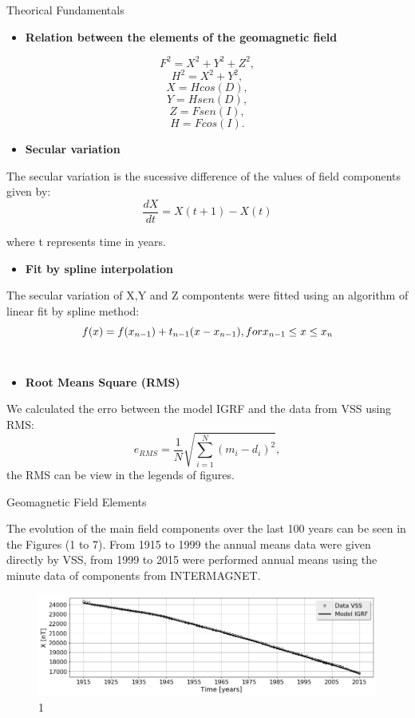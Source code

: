 \documentclass[final,t]{beamer}
\begin{document}
\begin{columns}[t]
\begin{column}{.66\linewidth}
\begin{columns}
\begin{column}{.31\linewidth}
\begin{block}{Theorical Fundamentals}


\begin{itemize}
\item \bf{Relation between the elements of the geomagnetic field}
\end{itemize}	
\[ F^{2} = X^{2} + Y^{2} + Z^{2},\]
 \[  H^{2} = X^{2} + Y^{2}, \]
\[	   X = Hcos(D),\]
\[	   Y = Hsen(D),\]
\[	   Z = Fsen(I),\]
\[	   H = Fcos(I).\]
   	

\begin{itemize}	
	\item \bf{Secular variation}
\end{itemize}
The secular variation is the sucessive difference of the values of field components given by:
\[\frac{dX}{dt} = X(t+1)-X(t)\]

where t represents time in years.

\begin{itemize}
		\item \bf{Fit by spline interpolation}
\end{itemize}
The secular variation of X,Y and Z compontents were fitted using an algorithm  of linear fit by spline method: 
	\[ f(x)= f(x_{n-1})+t_{n-1}(x-x_{n-1}), \\
	for x_{n-1} \le x \le x_{n} \]\\

\begin{itemize}
\item \bf{Root Means Square (RMS)}
\end{itemize}
We calculated the erro between the model IGRF and the data from VSS using RMS:
\[e_{RMS}=\frac{1}{N} \sqrt{\sum\limits_{i=1}^{N}(m_{i}-d_{i})^{2}}, 
\]
the RMS can be view in the legends of figures.
 
	
\end{block}	

\begin{block}{Geomagnetic Field Elements}

The evolution of the main field components over the last 100 years can be seen in the Figures (1 to 7). From 1915 to 1999 the  annual means data  were given directly by VSS, from 1999 to 2015 were performed annual means using the minute data of components from INTERMAGNET.

\begin{figure}
\centering
\includegraphics[scale=0.5]{"figs_ed/X mean all_V3"}
\caption[1]{1}
\label{fig:Xmeanall_V2}
\end{figure}
   

\end{block}
\end{column}
\end{columns}
\end{column}
\end{columns}
\end{document}
